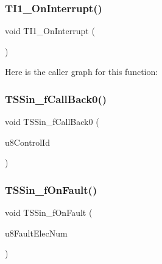 \subsubsection{\texorpdfstring{T\+I1\+\_\+\+On\+Interrupt()}{TI1\_OnInterrupt()}}
{\footnotesize\ttfamily void T\+I1\+\_\+\+On\+Interrupt (\begin{DoxyParamCaption}\item[{void}]{ }\end{DoxyParamCaption})}

Here is the caller graph for this function\+:
\mbox{\label{group___events__module_ga5969b4c9b3e47d79941c612897503fe4}} 
\subsubsection{\texorpdfstring{T\+S\+Sin\+\_\+f\+Call\+Back0()}{TSSin\_fCallBack0()}}
{\footnotesize\ttfamily void T\+S\+Sin\+\_\+f\+Call\+Back0 (\begin{DoxyParamCaption}\item[{\hyperlink{struct_t_s_s___c_o_n_t_r_o_l___i_d}{T\+S\+S\+\_\+\+C\+O\+N\+T\+R\+O\+L\+\_\+\+ID}}]{u8\+Control\+Id }\end{DoxyParamCaption})}

\mbox{\label{group___events__module_gaaade020d27159f2102fb3b994d1224ae}} 
\subsubsection{\texorpdfstring{T\+S\+Sin\+\_\+f\+On\+Fault()}{TSSin\_fOnFault()}}
{\footnotesize\ttfamily void T\+S\+Sin\+\_\+f\+On\+Fault (\begin{DoxyParamCaption}\item[{\hyperlink{group___p_e___types__module_ga0c8186d9b9b7880309c27230bbb5e69d}{byte}}]{u8\+Fault\+Elec\+Num }\end{DoxyParamCaption})}

